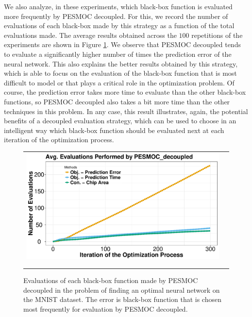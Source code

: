 We also analyze, in these experiments, which black-box function is evaluated more frequently by PESMOC decoupled.
For this, we record the number of evaluations of each black-box made by this strategy as a function of the
total evaluations made. The average results obtained across the $100$ repetitions of the experiments are shown
in Figure \ref{fig:nnet_counter}. We observe that PESMOC decoupled tends to evaluate a significantly higher
number of times the prediction error of the neural network. This also explains the better results obtained
by this strategy, which is able to focus on the evaluation of the black-box function that is most difficult to
model or that plays a critical role in the optimization problem. Of course, the prediction error takes more
time to evaluate than the other black-box functions, so PESMOC decoupled also takes a bit more time than the
other techniques in this problem. In any case, this result illustrates, again, the potential benefits of a
decoupled evaluation strategy, which can be used to choose in an intelligent way which black-box function
should be evaluated next at each iteration of the optimization process.

\begin{figure}[htb]
\begin{center}
        \begin{tabular}{cc}
                \vspace{-.2cm}
                \includegraphics[width=0.75\linewidth]{Figures/pesmoc/real/plot_rrnn_counter.pdf} \\ \\
                \vspace{-.1cm}
        \end{tabular}
        \caption{Evaluations of each black-box function made by PESMOC decoupled in the problem of finding an optimal
        neural network on the MNIST dataset. The error is black-box function that is chosen most frequently for evaluation
        by PESMOC decoupled.}
        \label{fig:nnet_counter}
\end{center}
\end{figure}

